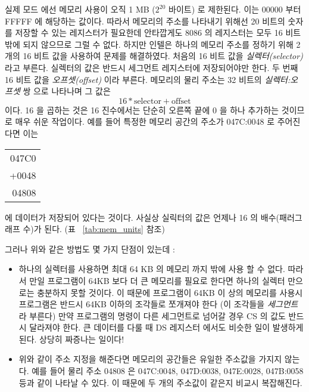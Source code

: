 실제 모드 에선 
메모리 사용이 오직 1 MB ($2^{20}$ 바이트) 로 제한된다. 이는 00000 부터 FFFFF 에 해당하는 값이다. 따라서 메모리의 주소를 나타내기 위해선 20 비트의
숫자를 저장할 수 있는 레지스터가 필요한데 안타깝게도 8086 의 레지스터는 모두 16 비트 밖에 되지 않으므로 그럴 수 없다. 하지만 인텔은 하나의 메모리 
주소를 정하기 위해 2 개의 16 비트 값을 사용하여 문제를 해결하였다. 처음의 16 비트 값을 \emph{실렉터(selector)} 라고 부른다. 실렉터의 값은 반드시
세그먼트 레지스터에 저장되어야만 한다. 두 번째 16 비트 값을 \emph{오프셋(offset)} 이라 부른다. 메모리의 물리 주소는 32 비트의 \emph{실렉터:오프셋} 쌍
으로 나타나며 그 값은
\[ 16 * \text{selector} + \text{offset} \]
이다. 16 을 곱하는 것은 16 진수에서는 단순히 오른쪽 끝에 0 을 하나 추가하는 것이므로 매우 쉬운 작업이다. 예를 들어 특정한 메모리 공간의 주소가 047C:0048 
로 주어진다면 이는
\begin{center}
\begin{tabular}{r}
047C0 \\
+0048 \\
\hline
04808 \\
\end{tabular}
\end{center}
에 데이터가 저장되어 있다는 것이다. 사실상 실릭터의 값은 언제나 16 의 배수(패러그래프 수)가 된다. (표 ~\ref{tab:mem_units} 참조)

그러나 위와 같은 방법도 몇 가지 단점이 있는데 : 
\begin{itemize}
\item
하나의 실렉터를 사용하면 최대 64 KB 의 메모리 까지 밖에 사용 할 수 없다. 따라서 만일 프로그램이 64KB 보다 더 큰 메모리를
필요로 한다면 하나의 실렉터 만으로는 충분하지 못할 것이다. 이 때문에 프로그램이 64KB 이 상의 메모리를 사용시 
프로그램은 반드시 64KB 이하의 조각들로 쪼개져야 한다 (이 조각들을 \emph{세그먼트} 라
부른다) 만약 프로그램의 명령이 다른 세그먼트로 넘어갈 경우 CS 의 값도 반드시 달라져야 한다. 큰 데이터를 다룰 때 DS 레지스터
에서도 비슷한 일이 발생하게 된다. 상당히 짜증나는 일이다!

\item 
위와 같이 주소 지정을 해준다면 메모리의 공간들은 유일한 주소값을 가지지 않는다. 예를 들어 물리 주소 04808 은 
047C:0048, 047D:0038, 047E:0028, 047B:0058 등과 같이 나타날 수 있다. 이 때문에 두 개의 주소값이 같은지 비교시 
복잡해진다.  

\end{itemize}

